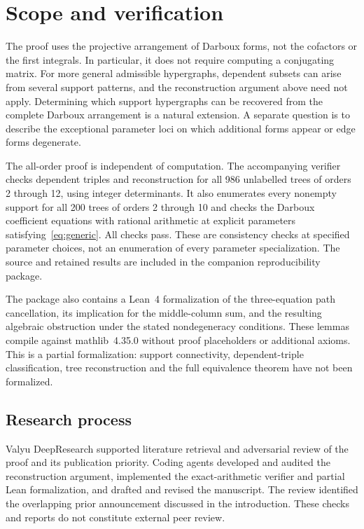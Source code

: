 \documentclass{amsart}
\theoremstyle{remark}
\numberwithin{equation}{section}
\begin{document}
\section{Scope and verification}
The proof uses the projective arrangement of Darboux forms, not the cofactors or the first integrals. In particular, it does not require computing a conjugating matrix. For more general admissible hypergraphs, dependent subsets can arise from several support patterns, and the reconstruction argument above need not apply. Determining which support hypergraphs can be recovered from the complete Darboux arrangement is a natural extension. A separate question is to describe the exceptional parameter loci on which additional forms appear or edge forms degenerate.

The all-order proof is independent of computation. The accompanying verifier checks dependent triples and reconstruction for all 986 unlabelled trees of orders 2 through 12, using integer determinants. It also enumerates every nonempty support for all 200 trees of orders 2 through 10 and checks the Darboux coefficient equations with rational arithmetic at explicit parameters satisfying~\eqref{eq:generic}. All checks pass. These are consistency checks at specified parameter choices, not an enumeration of every parameter specialization. The source and retained results are included in the companion reproducibility package.

The package also contains a Lean~4 formalization of the three-equation path cancellation, its implication for the middle-column sum, and the resulting algebraic obstruction under the stated nondegeneracy conditions. These lemmas compile against mathlib~4.35.0 without proof placeholders or additional axioms. This is a partial formalization: support connectivity, dependent-triple classification, tree reconstruction and the full equivalence theorem have not been formalized.

\subsection*{Research process}
Valyu DeepResearch supported literature retrieval and adversarial review of the proof and its publication priority. Coding agents developed and audited the reconstruction argument, implemented the exact-arithmetic verifier and partial Lean formalization, and drafted and revised the manuscript. The review identified the overlapping prior announcement discussed in the introduction. These checks and reports do not constitute external peer review.



\end{document}
